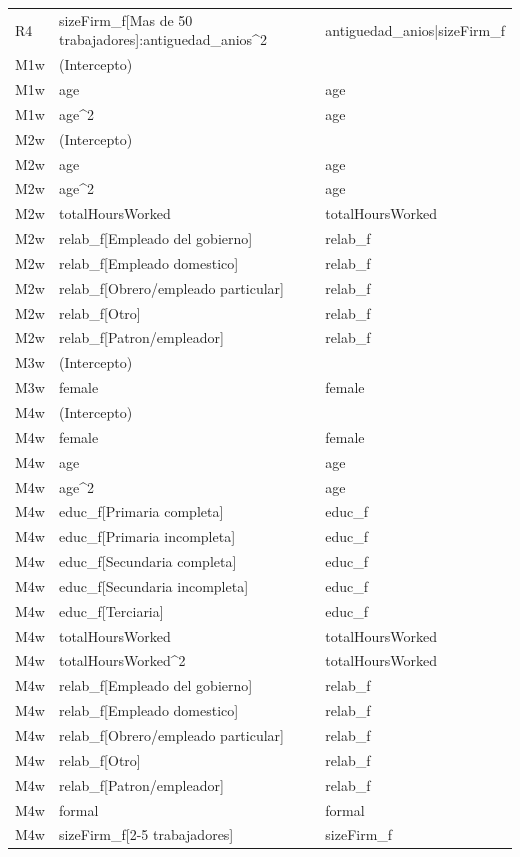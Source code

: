 \begin{longtable}{lll}
R4 & sizeFirm\_f[Mas de 50 trabajadores]:antiguedad\_anios\textasciicircum 2 & antiguedad\_anios|sizeFirm\_f \\
M1w & (Intercepto) &  \\
M1w & age & age \\
M1w & age\textasciicircum 2 & age \\
M2w & (Intercepto) &  \\
M2w & age & age \\
M2w & age\textasciicircum 2 & age \\
M2w & totalHoursWorked & totalHoursWorked \\
M2w & relab\_f[Empleado del gobierno] & relab\_f \\
M2w & relab\_f[Empleado domestico] & relab\_f \\
M2w & relab\_f[Obrero/empleado particular] & relab\_f \\
M2w & relab\_f[Otro] & relab\_f \\
M2w & relab\_f[Patron/empleador] & relab\_f \\
M3w & (Intercepto) &  \\
M3w & female & female \\
M4w & (Intercepto) &  \\
M4w & female & female \\
M4w & age & age \\
M4w & age\textasciicircum 2 & age \\
M4w & educ\_f[Primaria completa] & educ\_f \\
M4w & educ\_f[Primaria incompleta] & educ\_f \\
M4w & educ\_f[Secundaria completa] & educ\_f \\
M4w & educ\_f[Secundaria incompleta] & educ\_f \\
M4w & educ\_f[Terciaria] & educ\_f \\
M4w & totalHoursWorked & totalHoursWorked \\
M4w & totalHoursWorked\textasciicircum 2 & totalHoursWorked \\
M4w & relab\_f[Empleado del gobierno] & relab\_f \\
M4w & relab\_f[Empleado domestico] & relab\_f \\
M4w & relab\_f[Obrero/empleado particular] & relab\_f \\
M4w & relab\_f[Otro] & relab\_f \\
M4w & relab\_f[Patron/empleador] & relab\_f \\
M4w & formal & formal \\
M4w & sizeFirm\_f[2-5 trabajadores] & sizeFirm\_f \\

\end{longtable}
